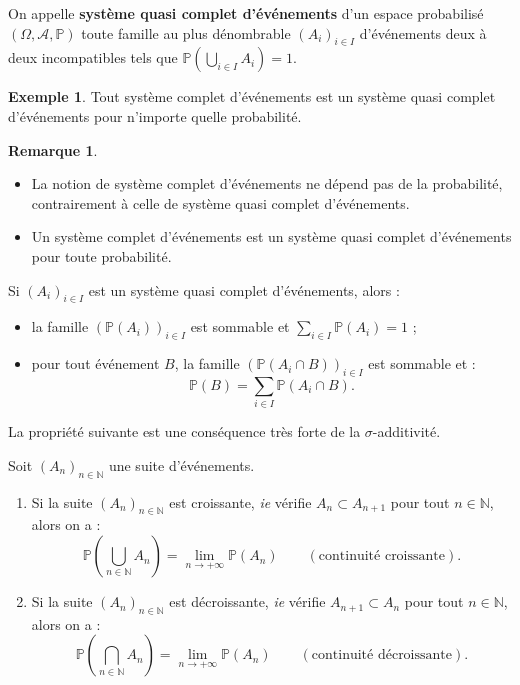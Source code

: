 \documentclass[french]{article}
\renewcommand{\P}{\mathbb{P}}
\newcommand{\N}{\mathbb{N}}
\theoremstyle{plain}
\theoremstyle{definition}
\newtheorem*{ex}{Exemple}
\newtheorem*{rmq}{Remarque}
\theoremstyle{remark}
\begin{document}
\begin{dfn}
	On appelle \textbf{système quasi complet d'événements} d'un espace probabilisé $(\Omega,\mathcal{A},\P)$ toute famille au plus dénombrable $(A_i)_{i\in I}$ d'événements deux à deux incompatibles tels que $\P\displaystyle\left(\bigcup_{i\in I}A_i\right)=1$.
\end{dfn}

\begin{ex}
	Tout système complet d'événements est un système quasi complet d'événements pour n'importe quelle probabilité.
\end{ex}

\begin{rmq}
	\begin{itemize}
		\item La notion de système complet d'événements ne dépend pas de la probabilité, contrairement à celle de système quasi complet d'événements.
		\item Un système complet d'événements est un système quasi complet d'événements pour toute probabilité.
	\end{itemize}
\end{rmq}

\begin{prop}%
	Si $(A_i)_{i\in I}$ est un système quasi complet d'événements, alors :
	\begin{itemize}
		\item la famille $(\P(A_i))_{i\in I}$ est sommable et $\displaystyle\sum_{i\in I}\P(A_i)=1$ ;
		\item pour tout événement $B$, la famille $(\P(A_i\cap B))_{i\in I}$ est sommable et : $$\P(B)=\sum_{i\in I}\P(A_i\cap B).$$
	\end{itemize}
\end{prop}

La propriété suivante est une conséquence très forte de la $\sigma$-additivité.

\begin{thm}%
	Soit $(A_n)_{n\in\N}$ une suite d'événements.
	\begin{enumerate}
		\item Si la suite $(A_n)_{n\in\N}$ est croissante, \textit{ie} vérifie $A_n\subset A_{n+1}$ pour tout $n\in\N$, alors on a : $$\P\left(\bigcup_{n\in\N}A_n\right)=\underset{n\to+\infty}{\lim}\P(A_n)\quad\quad(\text{continuité croissante}).$$
		\item Si la suite $(A_n)_{n\in\N}$ est décroissante, \textit{ie} vérifie $A_{n+1}\subset A_{n}$ pour tout $n\in\N$, alors on a : $$\P\left(\bigcap_{n\in\N}A_n\right)=\underset{n\to+\infty}{\lim}\P(A_n)\quad\quad(\text{continuité décroissante}).$$
	\end{enumerate}
\end{thm}
\end{document}

